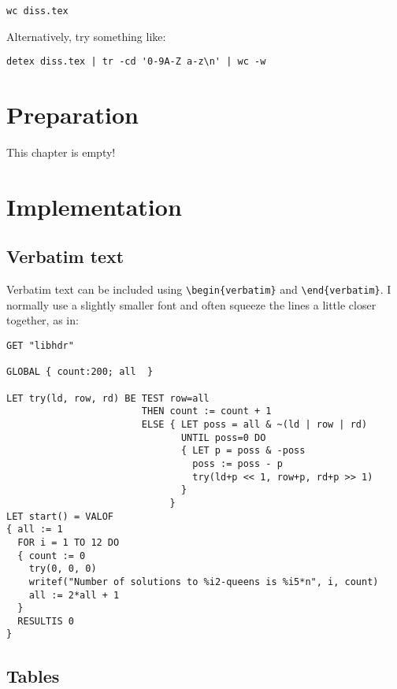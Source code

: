 \documentclass[12pt,twoside,notitlepage]{report}
\renewcommand{\baselinestretch}{1.1}    %
\begin{document}
{\tt wc diss.tex}

\noindent
Alternatively, try something like:

\verb/detex diss.tex | tr -cd '0-9A-Z a-z\n' | wc -w/




\cleardoublepage



\chapter{Preparation}

This chapter is empty!


\cleardoublepage
\chapter{Implementation}

\section{Verbatim text}

Verbatim text can be included using \verb|\begin{verbatim}| and
\verb|\end{verbatim}|. I normally use a slightly smaller font and
often squeeze the lines a little closer together, as in:

{\renewcommand{\baselinestretch}{0.8}\small\begin{verbatim}
GET "libhdr"
 
GLOBAL { count:200; all  }
 
LET try(ld, row, rd) BE TEST row=all
                        THEN count := count + 1
                        ELSE { LET poss = all & ~(ld | row | rd)
                               UNTIL poss=0 DO
                               { LET p = poss & -poss
                                 poss := poss - p
                                 try(ld+p << 1, row+p, rd+p >> 1)
                               }
                             }
LET start() = VALOF
{ all := 1
  FOR i = 1 TO 12 DO
  { count := 0
    try(0, 0, 0)
    writef("Number of solutions to %i2-queens is %i5*n", i, count)
    all := 2*all + 1
  }
  RESULTIS 0
}
\end{verbatim}
}

\section{Tables}
\end{document}
